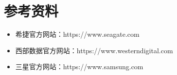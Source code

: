 \documentclass[12pt,UTF8]{ctexbook}
\begin{document}
\chapter{参考资料}

\begin{itemize}[leftmargin=2em]
    \item 希捷官方网站：https://www.seagate.com
    \item 西部数据官方网站：https://www.westerndigital.com
    \item 三星官方网站：https://www.samsung.com
\end{itemize}

\backmatter
\end{document}
